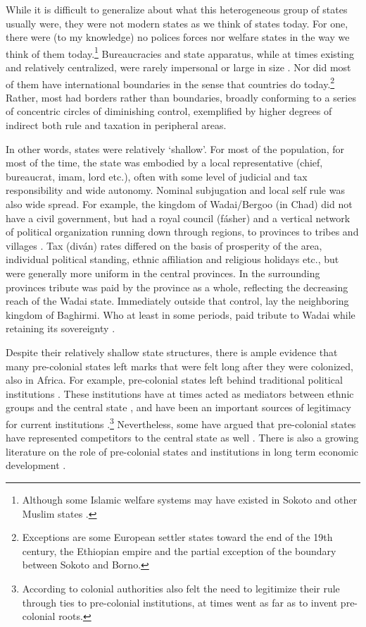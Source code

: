 While it is difficult to generalize about what this heterogeneous group of
states usually were, they were not modern states as we think of states today.
For one, there were (to my knowledge) no polices forces nor welfare states in
the way we think of them today.\footnote{Although some Islamic welfare systems
may have existed in Sokoto \citep{Buba_2018} and other Muslim states
\citep{WeissHolger2002SwiM}.} Bureaucracies and state apparatus, while at times
existing and relatively centralized, were rarely impersonal or large in size
\citep{Herbst2014}. Nor did most of them have international boundaries in the
sense that countries do today.\footnote{Exceptions are some European settler
states toward the end of the 19th century, the Ethiopian empire and the partial
exception of the boundary between Sokoto and Borno.} Rather, most had borders
rather than boundaries, broadly conforming to a series of concentric circles of
diminishing control, exemplified by higher degrees of indirect both rule and
taxation in peripheral areas.

In other words, states were relatively `shallow'. For most of the
population, for most of the time, the state was embodied by a local
representative (chief, bureaucrat, imam, lord etc.), often with some level of
judicial and tax responsibility and wide autonomy. Nominal subjugation and local
self rule was also wide spread. For example, the kingdom of Wadai/Bergoo (in
Chad) did not have a civil government, but had a royal council (fásher) and a
vertical network of political organization running down through regions, to
provinces to tribes and villages \citep{barth1857travels}. Tax (diván) rates
differed on the basis of prosperity of the area, individual political standing,
ethnic affiliation and religious holidays etc., but were generally more uniform
in the central provinces. In the surrounding provinces tribute was paid by the
province as a whole, reflecting the decreasing reach of the Wadai state.
Immediately outside that control, lay the neighboring kingdom of Baghirmi. Who
at least in some periods, paid tribute to Wadai while retaining its sovereignty
\citep{barth1857travels}.

Despite their relatively shallow state structures, there is ample evidence that
many pre-colonial states left marks that were felt long after they were
colonized, also in Africa. For example, pre-colonial states left behind
traditional political institutions \citep{Beall_2005, Holzinger_2020,
Neupert_Wentz_2021, Ubink_2008}. These institutions have at times acted as
mediators between ethnic groups and the central state \citep{boone2014property,
Englebert2002}, and have been an important sources of legitimacy for current
institutions \citep{Wig2016}.\footnote{According to \citet{mamdani2018citizen}
	colonial authorities also felt the need to legitimize their rule through
	ties to pre-colonial institutions, at times went as far as to invent
pre-colonial roots.} Nevertheless, some have argued that pre-colonial states
have represented competitors to the central state as well \citep{Herbst2014}.
There is also a growing literature on the role of pre-colonial states and
institutions in long term economic development \citep{Michalopoulos2018,
Acemoglu2014, Gennaioli2007, Bockstette2002, Wilfahrt_2021}.

